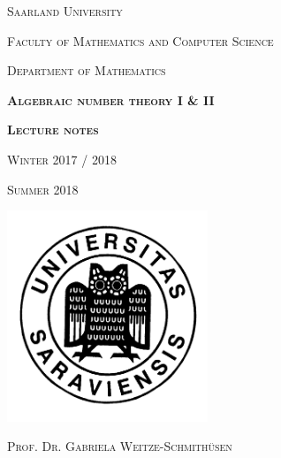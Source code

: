 \documentclass[a4paper, fontsize=11pt]{scrartcl}
\begin{document}
\pagestyle{empty}
\begin{center}

{\scshape\large Saarland University}

\smallskip
{\scshape\large Faculty of Mathematics and Computer Science}

\smallskip
{\scshape\large Department of Mathematics}

\vspace{20mm}

{\scshape\Huge\bfseries Algebraic number theory I \& II
}

\vspace{12mm}


{\scshape\bfseries\LARGE Lecture notes}

\vspace{2mm}

{\scshape\large Winter 2017 / 2018}

{\scshape\large Summer 2018}


\vfill
\centerline{\mbox{\includegraphics[width=60mm]{../img/universitas.png}}}

\vfill




\vspace{15mm}


{\scshape\huge Prof. Dr. Gabriela Weitze-Schmithüsen}


\vfill


\end{center}
\end{document}

